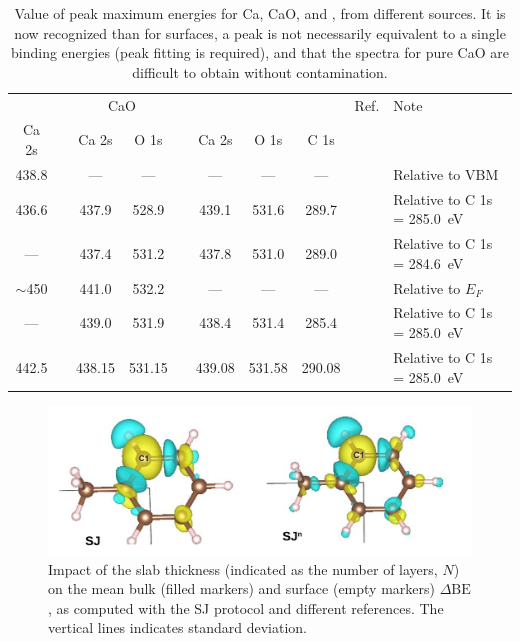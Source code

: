 \documentclass[journal=jpccck,manuscript=article]{achemso}
\def\dbe{\ensuremath{\Delta\text{BE}}}
\begin{document}
\begin{table}[!h]
	\begin{tabular}{c ccc c ccc cl}
		\toprule
		\ce{Ca^0} & & \multicolumn{2}{c}{CaO} & & \multicolumn{3}{c}{\ce{CaCO3}} & Ref. & Note\\
		\cline{1-1} \cline{3-4} \cline{6-8}
		Ca 2s & & Ca 2s & O 1s  & & Ca 2s & O 1s & C 1s\\
		\midrule
		438.8 & &---&---&& --- & --- &--- & \citenum{fuggleCorelevelBindingEnergies1980} & Relative to VBM\\
		436.6 & & 437.9 & 528.9& & 439.1 &531.6 & 289.7& \citenum{sosulnikovXrayPhotoelectronStudies1992}& Relative to C 1s = \SI{285.0}{\electronvolt}\\
		 --- && 437.4 & 531.2&& 437.8 & 531.0 & 289.0 & \citenum{demriXPSStudyCalcium1995} & Relative to C 1s = \SI{284.6}{\electronvolt}\\
		 $\sim$450 & & 441.0 & 532.2 & & --- & --- & --- & \citenum{ochsCO2ChemisorptionCa1998} & Relative to $E_F$ \\
		 --- & & 439.0 & 531.9 & & 438.4 & 531.4 & 285.4 & \citenum{cristHandbookMonochromaticXPS2000a} & Relative to C 1s = \SI{285.0}{\electronvolt}\\
		 442.5 & & 438.15 & 531.15 & & 439.08 & 531.58 & 290.08 & \citenum{cristXPSLibraryWebsite2021a} & Relative to C 1s = \SI{285.0}{\electronvolt}\\
		\bottomrule
	\end{tabular}
	\caption{Value of peak maximum energies for Ca, CaO, and  , from different sources. It is now recognized than for surfaces, a peak is not necessarily equivalent to a single binding energies (peak fitting is required), and that the spectra for pure CaO are difficult to obtain without contamination.\cite{dupinSystematicXPSStudies2000}}
\end{table}

\begin{figure}[!h]
\centering
\includegraphics[width=\linewidth]{FigureS3}
\caption{Impact of the slab thickness (indicated as the number of layers, $N$) on the mean bulk (filled markers)  and surface (empty markers) \dbe{}, as computed with the SJ protocol and different references. The vertical lines indicates standard deviation.}
\label{fig:slabsthicknessSJ}
\end{figure}
\end{document}
